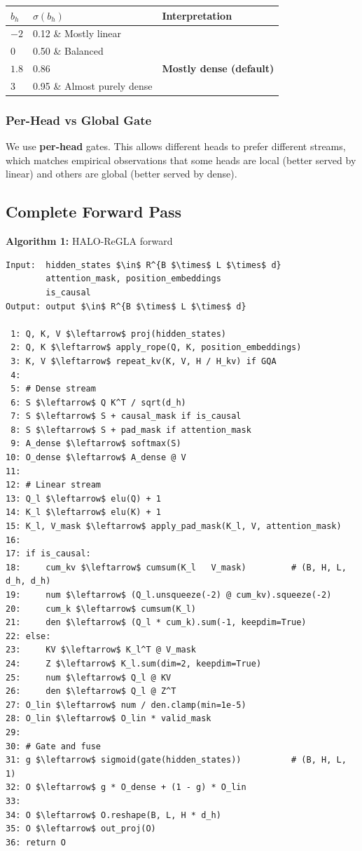 \begin{table}[H]
\centering
\small
\begin{tabular}{lll}
\toprule
\textbf{$b_h$} & \textbf{$\sigma(b_h)$} & \textbf{Interpretation} \\
\midrule
$-2$ & 0.12 \& Mostly linear \\
$0$ & 0.50 \& Balanced \\
$1.8$ & 0.86 & \textbf{Mostly dense (default)} \\
$3$ & 0.95 \& Almost purely dense \\
\bottomrule
\end{tabular}
\end{table}

\subsubsection{Per-Head vs Global Gate}

We use \textbf{per-head} gates. This allows different heads to prefer different 
streams, which matches empirical observations that some heads are local 
(better served by linear) and others are global (better served by dense).

\subsection{Complete Forward Pass}

\textbf{Algorithm 1:} HALO-ReGLA forward
\begin{lstlisting}
Input:  hidden_states $\in$ R^{B $\times$ L $\times$ d}
        attention_mask, position_embeddings
        is_causal
Output: output $\in$ R^{B $\times$ L $\times$ d}

 1: Q, K, V $\leftarrow$ proj(hidden_states)
 2: Q, K $\leftarrow$ apply_rope(Q, K, position_embeddings)
 3: K, V $\leftarrow$ repeat_kv(K, V, H / H_kv) if GQA
 4:
 5: # Dense stream
 6: S $\leftarrow$ Q K^T / sqrt(d_h)
 7: S $\leftarrow$ S + causal_mask if is_causal
 8: S $\leftarrow$ S + pad_mask if attention_mask
 9: A_dense $\leftarrow$ softmax(S)
10: O_dense $\leftarrow$ A_dense @ V
11:
12: # Linear stream
13: Q_l $\leftarrow$ elu(Q) + 1
14: K_l $\leftarrow$ elu(K) + 1
15: K_l, V_mask $\leftarrow$ apply_pad_mask(K_l, V, attention_mask)
16:
17: if is_causal:
18:     cum_kv $\leftarrow$ cumsum(K_l   V_mask)         # (B, H, L, d_h, d_h)
19:     num $\leftarrow$ (Q_l.unsqueeze(-2) @ cum_kv).squeeze(-2)
20:     cum_k $\leftarrow$ cumsum(K_l)
21:     den $\leftarrow$ (Q_l * cum_k).sum(-1, keepdim=True)
22: else:
23:     KV $\leftarrow$ K_l^T @ V_mask
24:     Z $\leftarrow$ K_l.sum(dim=2, keepdim=True)
25:     num $\leftarrow$ Q_l @ KV
26:     den $\leftarrow$ Q_l @ Z^T
27: O_lin $\leftarrow$ num / den.clamp(min=1e-5)
28: O_lin $\leftarrow$ O_lin * valid_mask
29:
30: # Gate and fuse
31: g $\leftarrow$ sigmoid(gate(hidden_states))          # (B, H, L, 1)
32: O $\leftarrow$ g * O_dense + (1 - g) * O_lin
33:
34: O $\leftarrow$ O.reshape(B, L, H * d_h)
35: O $\leftarrow$ out_proj(O)
36: return O
\end{lstlisting}

